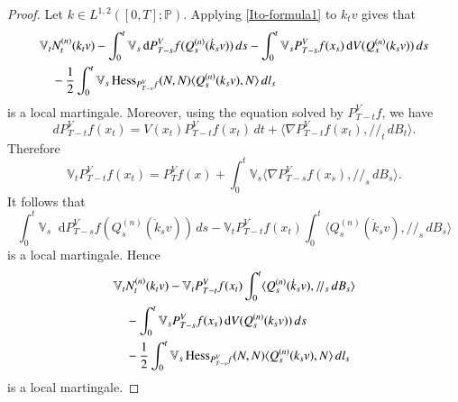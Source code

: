 \documentclass[11pt,twoside, reqno]{article}
\newcommand{\ed}{\mathop{}\!\mathrm{d}}
\def\mathpal#1{\mathop{\mathchoice{\text{\rm #1}}%
   {\text{\rm #1}}{\text{\rm #1}}%
   {\text{\rm #1}}}\nolimits}
\newcommand\Hess{\mathpal{Hess}}
\newcommand\1{\mathbbm{1}}
\theoremstyle{definition}
\numberwithin{equation}{section}
\begin{document}
\begin{proof}
Let $k\in L^{1,2}([0,T];\mathbb P)$. Applying \eqref{Ito-formula1} to
$k_tv$ gives that
\begin{align*}
        &\mathbb V_tN_t^{(n)}(k_tv)
        -\int_0^t\mathbb V_s \ed P_{T-s}^Vf(Q_s^{(n)}(\dot k_sv))\,ds
        -\int_0^t\mathbb V_sP_{T-s}^Vf(x_s)\ed V(Q_s^{(n)}(k_sv))\,ds
        \\
        &\quad
        -\frac12\int_0^t\mathbb V_s\Hess_{P_{T-s}^Vf}(N,N)
        \langle Q_s^{(n)}(k_sv),N\rangle\,dl_s
\end{align*}
is a local martingale. Moreover, using the equation solved by
$P_{T-t}^Vf$, we have
\[
        d P_{T-t}^Vf(x_t)
        =V(x_t)P_{T-t}^Vf(x_t)\,dt
        +\langle \nabla P_{T-t}^Vf(x_t),/\!/_t\,dB_t\rangle.
\]
Therefore
\[
        \mathbb V_tP_{T-t}^Vf(x_t)
        =P_T^Vf(x)
        +\int_0^t\mathbb V_s
        \langle \nabla P_{T-s}^Vf(x_s),/\!/_s\,dB_s\rangle.
\]
It follows that
\[
        \int_0^t\mathbb V_s \ed P_{T-s}^Vf(Q_s^{(n)}(\dot k_sv))\,ds
        -\mathbb V_tP_{T-t}^Vf(x_t)
        \int_0^t\langle Q_s^{(n)}(\dot k_sv),/\!/_s\,dB_s\rangle
\]
is a local martingale. Hence
\begin{align}\label{martingale-1}
        &\mathbb V_tN_t^{(n)}(k_tv)
        -\mathbb V_tP_{T-t}^Vf(x_t)
        \int_0^t\langle Q_s^{(n)}(\dot k_sv),/\!/_s\,dB_s\rangle
        \notag\\
        &\quad
        -\int_0^t\mathbb V_sP_{T-s}^Vf(x_s)\ed V(Q_s^{(n)}(k_sv))\,ds
        \notag\\
        &\quad
        -\frac12\int_0^t\mathbb V_s\Hess_{P_{T-s}^Vf}(N,N)
        \langle Q_s^{(n)}(k_sv),N\rangle\,dl_s
\end{align}
is a local martingale.




\end{proof}
\end{document}
